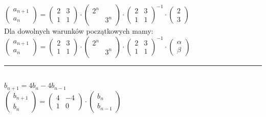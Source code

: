 $\begin{pmatrix} 
    a_{n+1} \\ a_n
    \end{pmatrix} = \begin{pmatrix} 2 & 3 \\ 1 & 1 \end{pmatrix} 
    \cdot \begin{pmatrix} 2^n &  \\  & 3^n \end{pmatrix} 
    \cdot \begin{pmatrix} 2 & 3 \\ 1 & 1 \end{pmatrix}^{-1}
    \cdot \begin{pmatrix} 2 \\ 3 \end{pmatrix}$ \\
Dla dowolnych warunków początkowych mamy: \\
$\begin{pmatrix} 
    a_{n+1} \\ a_n
    \end{pmatrix} = \begin{pmatrix} 2 & 3 \\ 1 & 1 \end{pmatrix} 
    \cdot \begin{pmatrix} 2^n &  \\  & 3^n \end{pmatrix} 
    \cdot \begin{pmatrix} 2 & 3 \\ 1 & 1 \end{pmatrix}^{-1}
    \cdot \begin{pmatrix} \alpha \\ \beta \end{pmatrix}$ \\
\noindent\rule{\textwidth}{0.4pt}\\ 
$b_{n+1} = 4 b_n - 4 b_{n-1}$ \\
$\begin{pmatrix} 
    b_{n+1} \\ b_n
    \end{pmatrix} = \begin{pmatrix} 4 & -4 \\ 1 & 0 \end{pmatrix} \cdot \begin{pmatrix} b_n \\ b_{n-1}
    \end{pmatrix}$ \\ 
